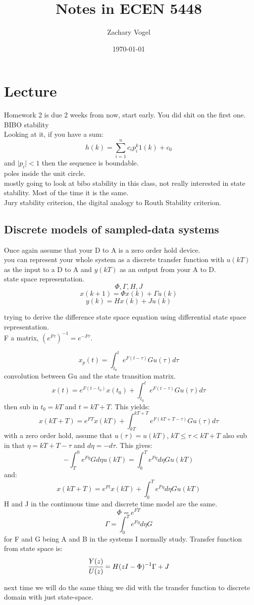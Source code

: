 \documentclass{article}
\author{Zachary Vogel}
\date{\today}
\title{Notes in ECEN 5448}
\begin{document}
\maketitle


\section*{Lecture}
Homework 2 is due 2 weeks from now, start early. You did shit on the first one.\\

BIBO stability\\

Looking at it, if you have a sum:\\
\[h(k)=\sum_{i=1}^n c_ip_i^k 1(k)+c_0\]
and $\lvert p_i\rvert <1$ then the sequence is boundable.\\
poles inside the unit circle.\\
mostly going to look at bibo stability in this class, not really interested in state stability. Most of the time it is the same.\\


Jury stability criterion, the digital analogy to Routh Stability criterion.\\

\subsection*{Discrete models of sampled-data systems}
Once again assume that your D to A is a zero order hold device.\\
you can represent your whole system as a discrete transfer function with $u(kT)$ as the input to a D to A and $y(kT)$ as an output from your A to D.\\

state space representation.
\[\Phi, \Gamma, H, J\]
\[x(k+1)=\Phi x(k)+\Gamma u(k)\]
\[y(k)=H x(k)+Ju(k)\]

trying to derive the difference state space equation using differential state space representation.\\

F a matrix, $(e^{F\tau})^{-1}=e^{-F\tau}$.

\[x_p(t)=\int_{t_0}^te^{F(t-\tau)}Gu(\tau)d\tau\]
convolution between Gu and the state transition matrix.\\

\[x(t)=e^{F(t-t_0)}x(t_0)+\int_{t_0}^te^{F(t-\tau)}Gu(\tau)d\tau\]
then sub in $t_0=kT$ and $t=kT+T$. This yields:
\[x(kT+T)=e^{FT}x(kT)+\int_{kT}^{kT+T}e^{F(kT+T-\tau)}Gu(\tau)d\tau\]
with a zero order hold,  assume that $u(\tau)=u(kT)$, $kT\leq \tau<kT+T$ also sub in that $\eta=kT+T-\tau$ and $d\eta=-d\tau$. This gives:
\[-\int_T^0e^{F\eta}Gd\eta u(kT)=\int_0^Te^{F\eta}d\eta Gu(kT)\]
and:
\[x(kT+T)=e^{Ft}x(kT)+\int_0^Te^{F\eta}d\eta Gu(kT)\]
H and J in the continuous time and discrete time model are the same.
\[\Phi=e^{FT}\]
\[\Gamma=\int_0^Te^{F\eta}d\eta G\]
for F and G being A and B in the systems I normally study. Transfer function from state space is:
\[\cfrac{Y(z)}{U(z)}=H(zI-\Phi)^{-1}\Gamma+J\]


next time we will do the same thing we did with the transfer function to discrete domain with just state-space.
\end{document}
